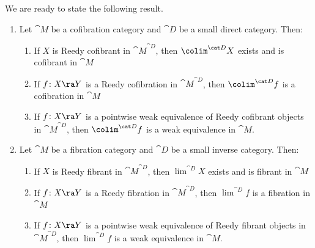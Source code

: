 We are ready to state the following result.
\begin{thm}
\label{thm:colimdirect}
\mbox{}
\begin{enumerate}
\item
Let ${\cat M}$ be a cofibration category and ${\cat D}$ be a small direct category. Then:
\begin{enumerate}
\item
If $X$ is Reedy cofibrant in ${\cat M}^{\cat D}$, then $\colim^{\cat D} X$ exists and is cofibrant in ${\cat M}$
\item
If $f \colon X \ra Y$ is a Reedy cofibration in ${\cat M}^{\cat D}$, then $\colim^{\cat D} f$ is a cofibration in ${\cat M}$
\item
If $f \colon X \ra Y$ is a pointwise weak equivalence of Reedy cofibrant objects in ${\cat M}^{\cat D}$, then $\colim^{\cat D} f$ is a weak equivalence in ${\cat M}$.
\end{enumerate}
\item
Let ${\cat M}$ be a fibration category and ${\cat D}$ be a small inverse category. Then:
\begin{enumerate}
\item
If $X$ is Reedy fibrant in ${\cat M}^{\cat D}$, then $\lim^{\cat D} X$ exists and is fibrant in ${\cat M}$
\item
If $f \colon X \ra Y$ is a Reedy fibration in ${\cat M}^{\cat D}$, then $\lim^{\cat D} f$ is a fibration in ${\cat M}$
\item
If $f \colon X \ra Y$ is a pointwise weak equivalence of Reedy fibrant objects in ${\cat M}^{\cat D}$, then $\lim^{\cat D} f$ is a weak equivalence in ${\cat M}$.
\end{enumerate}
\end{enumerate}
\end{thm}

